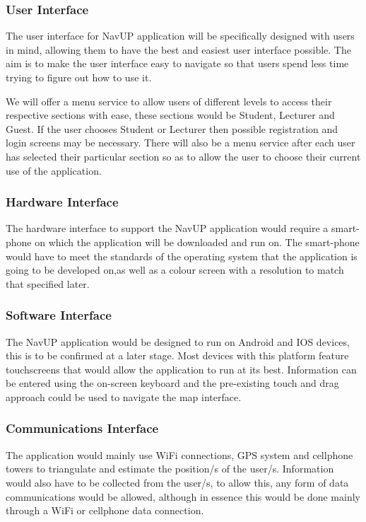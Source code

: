 \subsubsection{User Interface}
The user interface for NavUP application will be specifically designed with users in mind, allowing them to have the best and easiest user interface possible. The aim is to make the user interface easy to navigate so that users spend less time trying to figure out how to use it.

We will offer a menu service to allow users of different levels to access their respective sections with ease, these sections would be Student, Lecturer and Guest. If the user chooses Student or Lecturer then possible registration and login screens may be necessary. There will also be a menu service after each user has selected their particular section so as to allow the user to choose their current use of the application. 

\subsubsection{Hardware Interface}
The hardware interface to support the NavUP application would require a smart-phone on which the application will be downloaded and run on. The smart-phone would have to meet the standards of the operating system that the application is going to be developed on,as well as a colour screen with a resolution to match that specified later. 

\subsubsection{Software Interface}
The NavUP application would be designed to run on Android and IOS devices, this is to be confirmed at a later stage. Most devices with this platform feature touchscreens that would allow the application to run at its best. Information can be entered using the on-screen keyboard and the pre-existing touch and drag approach could be used to navigate the map interface. 

\subsubsection{Communications Interface}
The application would mainly use WiFi connections, GPS system and cellphone towers to triangulate and estimate the position/s of the user/s. Information would also have to be collected from the user/s, to allow this, any form of data communications would be allowed, although in essence this would be done mainly through a WiFi or cellphone data connection. 